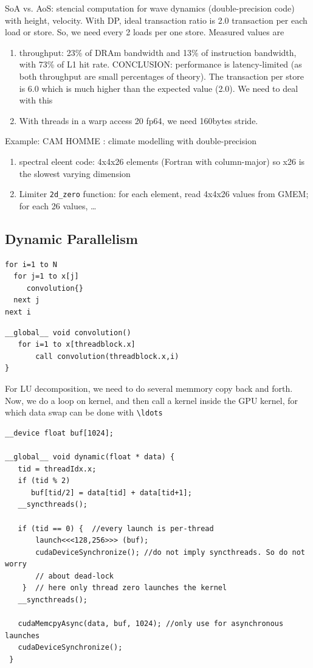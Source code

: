 SoA vs. AoS: stencial computation for wave dynamics (double-precision code) with
height, velocity. With DP, ideal transaction ratio is 2.0 transaction per each
load or store.
So, we need every 2 loads per one store. Measured values are
\begin{enumerate}
  \item throughput: 23\% of DRAm bandwidth and 13\% of instruction bandwidth,
  with 73\% of L1 hit rate. CONCLUSION: performance is latency-limited (as both
  throughput are small percentages of theory). The transaction per store is 6.0
  which is much higher than the expected value (2.0). We need to deal with this
  \item With threads in a warp access 20 fp64, we need 160bytes stride. 
\end{enumerate}


Example: CAM HOMME : climate modelling with double-precision
\begin{enumerate}
  \item spectral eleent code: 4x4x26 elements (Fortran with column-major) so x26
  is the slowest varying dimension
  \item Limiter \verb!2d_zero! function: for each element, read 4x4x26 values
  from GMEM; for each 26 values, \ldots
\end{enumerate}



\subsection{Dynamic Parallelism}


\begin{verbatim}
for i=1 to N
  for j=1 to x[j]
     convolution{}
  next j
next i
\end{verbatim}

\begin{verbatim}
__global__ void convolution()
   for i=1 to x[threadblock.x]
       call convolution(threadblock.x,i)
}
\end{verbatim}

For LU decomposition, we need to do several memmory copy back and forth. Now, we
do a loop on kernel, and then call a kernel inside the GPU kernel, for which
data swap can be done with \verb!\ldots!

\begin{verbatim}
__device float buf[1024];

__global__ void dynamic(float * data) {
   tid = threadIdx.x;
   if (tid % 2) 
      buf[tid/2] = data[tid] + data[tid+1];
   __syncthreads();
   
   if (tid == 0) {  //every launch is per-thread
       launch<<<128,256>>> (buf);
       cudaDeviceSynchronize(); //do not imply syncthreads. So do not worry
       // about dead-lock 
    }  // here only thread zero launches the kernel
   __syncthreads();
   
   cudaMemcpyAsync(data, buf, 1024); //only use for asynchronous launches  
   cudaDeviceSynchronize();
 }
\end{verbatim}

